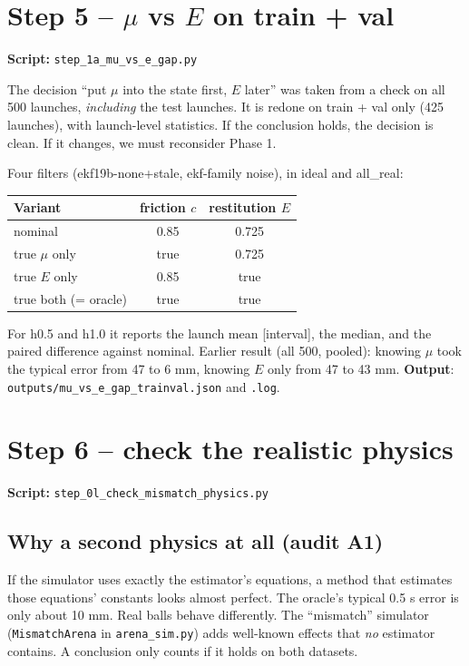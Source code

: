 \documentclass[11pt,a4paper]{article}
\begin{document}
\section{Step 5 -- $\mu$ vs $E$ on train + val}
\noindent\textbf{Script:} \texttt{step\_1a\_mu\_vs\_e\_gap.py}\par\medskip
\begin{why}
The decision ``put $\mu$ into the state first, $E$ later'' was taken from a check on all 500 launches, \emph{including} the
test launches. It is redone on train + val only (425 launches), with launch-level statistics. If the conclusion holds,
the decision is clean. If it changes, we must reconsider Phase 1.
\end{why}
Four filters (ekf19b-none+stale, ekf-family noise), in ideal and all\_real:
\begin{center}\small
\begin{tabular}{@{}lcc@{}}\toprule
Variant & friction $c$ & restitution $E$\\\midrule
nominal & 0.85 & 0.725\\
true $\mu$ only & true & 0.725\\
true $E$ only & 0.85 & true\\
true both (= oracle) & true & true\\\bottomrule
\end{tabular}\end{center}
For h0.5 and h1.0 it reports the launch mean [interval], the median, and the paired difference against nominal.
Earlier result (all 500, pooled): knowing $\mu$ took the typical error from 47 to 6 mm, knowing $E$ only from 47 to 43 mm.
\textbf{Output}: \texttt{outputs/mu\_vs\_e\_gap\_trainval.json} and \texttt{.log}.

\section{Step 6 -- check the realistic physics}
\noindent\textbf{Script:} \texttt{step\_0l\_check\_mismatch\_physics.py}\par\medskip

\subsection{Why a second physics at all (audit A1)}
If the simulator uses exactly the estimator's equations, a method that estimates those equations' constants looks
almost perfect. The oracle's typical 0.5 s error is only about 10 mm. Real balls behave differently. The ``mismatch''
simulator (\texttt{MismatchArena} in \texttt{arena\_sim.py}) adds well-known effects that \emph{no} estimator contains.
A conclusion only counts if it holds on both datasets.
\end{document}
